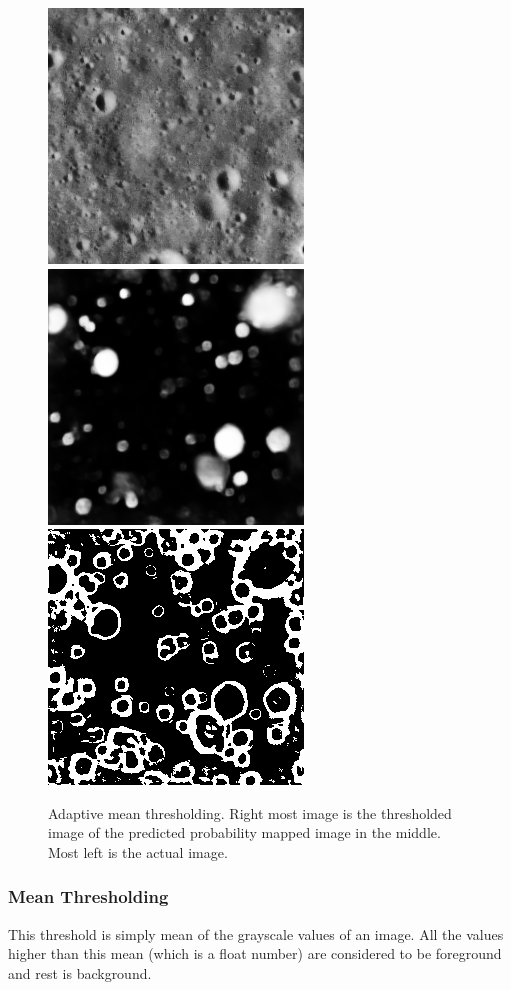 \documentclass[11pt]{article}
\begin{document}
\begin{figure}[ht!]
	\includegraphics[width=.3\textwidth]{files/results/26.png}\hfill	
	\includegraphics[width=.3\textwidth]{files/results/26_predict.png}\hfill
	\includegraphics[width=.3\textwidth]{files/results/adaptiveMean_mean.png}\hfill
	\caption{Adaptive mean thresholding. Right most image is the thresholded image of the predicted probability mapped image in the middle. Most left is the actual image.}
	\label{Adaptive mean thresholding}
\end{figure}

\subsubsection{Mean Thresholding}
This threshold is simply mean of the grayscale values of an image. All the values higher than this mean (which is a float number) are considered to be foreground and rest is background.
\end{document}
